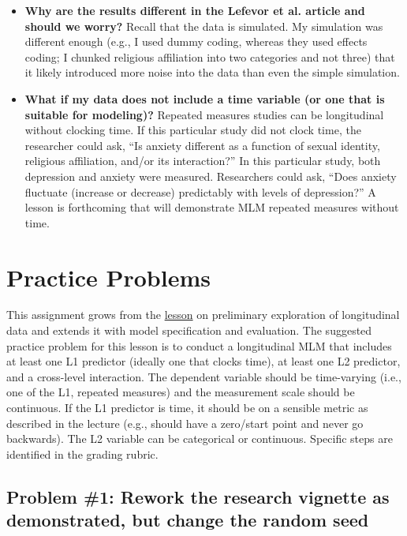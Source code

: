 \documentclass[
  11pt,
]{book}
\begin{document}
\begin{itemize}
\item
  \textbf{Why are the results different in the Lefevor et al. \citeyearpar{lefevor_religious_2017} article and should we worry?} Recall that the data is simulated. My simulation was different enough (e.g., I used dummy coding, whereas they used effects coding; I chunked religious affiliation into two categories and not three) that it likely introduced more noise into the data than even the simple simulation.
\item
  \textbf{What if my data does not include a time variable (or one that is suitable for modeling)?} Repeated measures studies can be longitudinal without clocking time. If this particular study did not clock time, the researcher could ask, ``Is anxiety different as a function of sexual identity, religious affiliation, and/or its interaction?'' In this particular study, both depression and anxiety were measured. Researchers could ask, ``Does anxiety fluctuate (increase or decrease) predictably with levels of depression?'' A lesson is forthcoming that will demonstrate MLM repeated measures without time.
\end{itemize}

\hypertarget{practice-problems-2}{%
\section{Practice Problems}\label{practice-problems-2}}

This assignment grows from the \protect\hyperlink{MLMexplore}{lesson} on preliminary exploration of longitudinal data and extends it with model specification and evaluation. The suggested practice problem for this lesson is to conduct a longitudinal MLM that includes at least one L1 predictor (ideally one that clocks time), at least one L2 predictor, and a cross-level interaction. The dependent variable should be time-varying (i.e., one of the L1, repeated measures) and the measurement scale should be continuous. If the L1 predictor is time, it should be on a sensible metric as described in the lecture (e.g., should have a zero/start point and never go backwards). The L2 variable can be categorical or continuous. Specific steps are identified in the grading rubric.

\hypertarget{problem-1-rework-the-research-vignette-as-demonstrated-but-change-the-random-seed-2}{%
\subsection{Problem \#1: Rework the research vignette as demonstrated, but change the random seed}\label{problem-1-rework-the-research-vignette-as-demonstrated-but-change-the-random-seed-2}}
\end{document}
